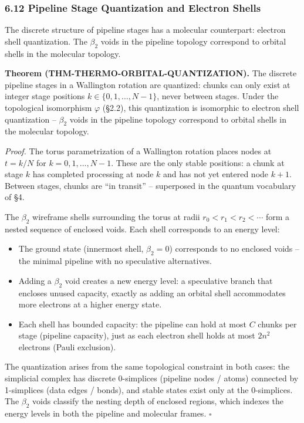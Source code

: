 \documentclass[
  11pt,
]{article}
\providecommand{\tightlist}{%
  \setlength{\itemsep}{0pt}\setlength{\parskip}{0pt}}
\begin{document}
\subsubsection{6.12 Pipeline Stage Quantization and Electron
Shells}\label{pipeline-stage-quantization-and-electron-shells}

The discrete structure of pipeline stages has a molecular counterpart:
electron shell quantization. The \(\beta_2\) voids in the pipeline
topology correspond to orbital shells in the molecular topology.

\textbf{Theorem (THM-THERMO-ORBITAL-QUANTIZATION).} The discrete
pipeline stages in a Wallington rotation are quantized: chunks can only
exist at integer stage positions \(k \in \{0, 1, \ldots, N-1\}\), never
between stages. Under the topological isomorphism \(\varphi\) (§2.2),
this quantization is isomorphic to electron shell quantization --
\(\beta_2\) voids in the pipeline topology correspond to orbital shells
in the molecular topology.

\emph{Proof.} The torus parametrization of a Wallington rotation places
nodes at \(t = k/N\) for \(k = 0, 1, \ldots, N-1\). These are the only
stable positions: a chunk at stage \(k\) has completed processing at
node \(k\) and has not yet entered node \(k+1\). Between stages, chunks
are ``in transit'' -- superposed in the quantum vocabulary of §4.

The \(\beta_2\) wireframe shells surrounding the torus at radii
\(r_0 < r_1 < r_2 < \cdots\) form a nested sequence of enclosed voids.
Each shell corresponds to an energy level:

\begin{itemize}
\tightlist
\item
  The ground state (innermost shell, \(\beta_2 = 0\)) corresponds to no
  enclosed voids -- the minimal pipeline with no speculative
  alternatives.
\item
  Adding a \(\beta_2\) void creates a new energy level: a speculative
  branch that encloses unused capacity, exactly as adding an orbital
  shell accommodates more electrons at a higher energy state.
\item
  Each shell has bounded capacity: the pipeline can hold at most \(C\)
  chunks per stage (pipeline capacity), just as each electron shell
  holds at most \(2n^2\) electrons (Pauli exclusion).
\end{itemize}

The quantization arises from the same topological constraint in both
cases: the simplicial complex has discrete 0-simplices (pipeline nodes /
atoms) connected by 1-simplices (data edges / bonds), and stable states
exist only at the 0-simplices. The \(\beta_2\) voids classify the
nesting depth of enclosed regions, which indexes the energy levels in
both the pipeline and molecular frames. \(\square\)
\end{document}

